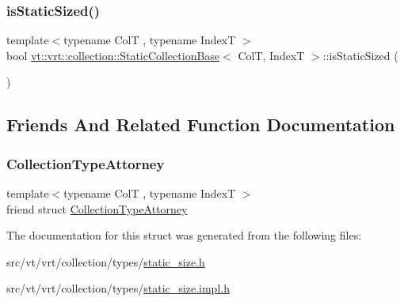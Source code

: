 \mbox{\label{structvt_1_1vrt_1_1collection_1_1_static_collection_base_a2220acb376a93897e2dfde15eaaadedc}} 
\subsubsection{\texorpdfstring{is\+Static\+Sized()}{isStaticSized()}}
{\footnotesize\ttfamily template$<$typename ColT , typename IndexT $>$ \\
bool \hyperlink{structvt_1_1vrt_1_1collection_1_1_static_collection_base}{vt\+::vrt\+::collection\+::\+Static\+Collection\+Base}$<$ ColT, IndexT $>$\+::is\+Static\+Sized (\begin{DoxyParamCaption}{ }\end{DoxyParamCaption})\hspace{0.3cm}{\ttfamily [static]}}



\subsection{Friends And Related Function Documentation}
\mbox{\label{structvt_1_1vrt_1_1collection_1_1_static_collection_base_abb4eb03ec2c75b459ceec69021d22a2b}} 
\subsubsection{\texorpdfstring{Collection\+Type\+Attorney}{CollectionTypeAttorney}}
{\footnotesize\ttfamily template$<$typename ColT , typename IndexT $>$ \\
friend struct \hyperlink{structvt_1_1vrt_1_1collection_1_1_collection_type_attorney}{Collection\+Type\+Attorney}\hspace{0.3cm}{\ttfamily [friend]}}



The documentation for this struct was generated from the following files\+:\begin{DoxyCompactItemize}
\item 
src/vt/vrt/collection/types/\hyperlink{static__size_8h}{static\+\_\+size.\+h}\item 
src/vt/vrt/collection/types/\hyperlink{static__size_8impl_8h}{static\+\_\+size.\+impl.\+h}\end{DoxyCompactItemize}
